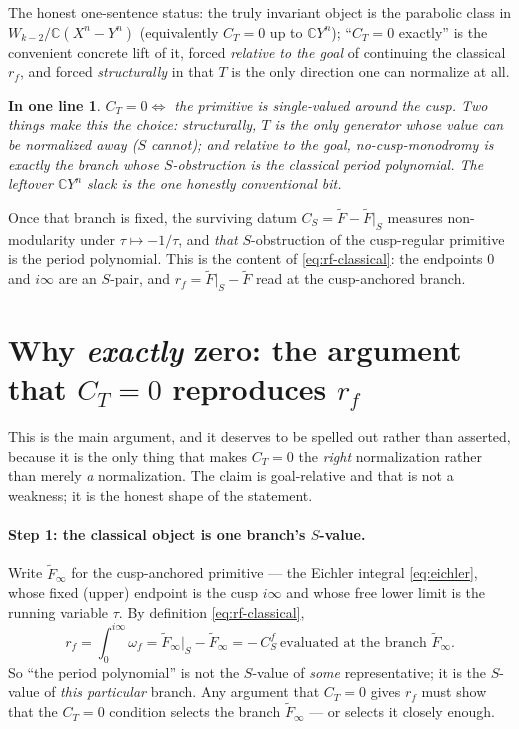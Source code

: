 \documentclass[11pt]{article}
\newcommand{\CC}{\mathbb{C}}
\newcommand{\Eich}{\widetilde{F}}
\newtheorem*{slogan}{In one line}
\begin{document}
The honest one-sentence status: the truly invariant object is the
parabolic class in $W_{k-2}/\CC(X^n - Y^n)$ (equivalently $C_T = 0$ up to
$\CC Y^n$); ``$C_T = 0$ exactly'' is the convenient concrete lift of it,
forced \emph{relative to the goal} of continuing the classical $r_f$, and
forced \emph{structurally} in that $T$ is the only direction one can
normalize at all.

\begin{slogan}
$C_T = 0 \iff$ the primitive is single-valued around the cusp. Two things
make this the choice: structurally, $T$ is the only generator whose value
can be normalized away ($S$ cannot); and relative to the goal,
no-cusp-monodromy is exactly the branch whose $S$-obstruction
\emph{is} the classical period polynomial. The leftover $\CC Y^n$ slack
is the one honestly conventional bit.
\end{slogan}

\noindent
Once that branch is fixed, the surviving datum $C_S = \Eich - \Eich|_S$
measures non-modularity under $\tau \mapsto -1/\tau$, and \emph{that}
$S$-obstruction of the cusp-regular primitive is the period polynomial.
This is the content of \eqref{eq:rf-classical}: the endpoints $0$ and
$i\infty$ are an $S$-pair, and $r_f = \Eich|_S - \Eich$ read at the
cusp-anchored branch.

\section{Why \emph{exactly} zero: the argument that $C_T=0$ reproduces $r_f$}

This is the main argument, and it deserves to be spelled out rather than
asserted, because it is the only thing that makes $C_T = 0$ the
\emph{right} normalization rather than merely \emph{a} normalization. The
claim is goal-relative and that is not a weakness; it is the honest shape
of the statement.

\paragraph{Step 1: the classical object is one branch's $S$-value.}
Write $\Eich_\infty$ for the cusp-anchored primitive --- the Eichler
integral \eqref{eq:eichler}, whose fixed (upper) endpoint is the cusp
$i\infty$ and whose free lower limit is the running variable $\tau$. By definition
\eqref{eq:rf-classical},
\[
  r_f = \int_0^{i\infty}\omega_f = \Eich_\infty\big|_S - \Eich_\infty
      = -\,C^f_S \ \text{evaluated at the branch } \Eich_\infty .
\]
So ``the period polynomial'' is not the $S$-value of \emph{some}
representative; it is the $S$-value of \emph{this particular} branch. Any
argument that $C_T=0$ gives $r_f$ must show that the $C_T=0$ condition
selects the branch $\Eich_\infty$ --- or selects it closely enough.
\end{document}
